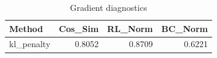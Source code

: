 \begin{table}[htbp]
\centering
\caption{Gradient diagnostics}
\label{tab:grad-diag}
\begin{tabular}{lrrr}
\toprule
\textbf{Method} & \textbf{Cos\_Sim} & \textbf{RL\_Norm} & \textbf{BC\_Norm} \\
\midrule
kl\_penalty & 0.8052 & 0.8709 & 0.6221 \\
\bottomrule
\end{tabular}
\end{table}